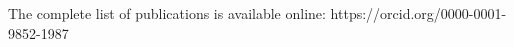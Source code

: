 
\begin{small}
The complete list of publications is available online: https://orcid.org/0000-0001-9852-1987
\end{small}


\begin{refsection}
	\nocite{Batut_Gigascience_2018}
	\nocite{Batut_Cell_2018}
	\nocite{Batut_JOSS_2017}
	\nocite{Defois_2017}
	\nocite{Batut_2014}
	\nocite{Batut_2013}

	\printbibliography[
	heading=none, 
	sorting=ydnt
	]
\end{refsection}
